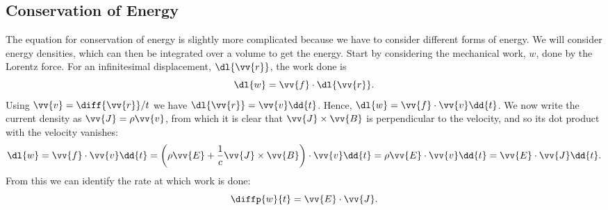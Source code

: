 \subsection{Conservation of Energy}
The equation for conservation of energy is slightly more complicated because we have to consider different forms of energy.
We will consider energy densities, which can then be integrated over a volume to get the energy.
Start by considering the mechanical work, \(w\), done by the Lorentz force.
For an infinitesimal displacement, \(\dl{\vv{r}}\), the work done is
\begin{equation}
    \dl{w} = \vv{f} \cdot \dl{\vv{r}}.
\end{equation}
Using \(\vv{v} = \diff{\vv{r}}/{t}\) we have \(\dl{\vv{r}} = \vv{v}\dd{t}\).
Hence, \(\dl{w} = \vv{f} \cdot \vv{v} \dd{t}\).
We now write the current density as \(\vv{J} = \rho\vv{v}\), from which it is clear that \(\vv{J} \times \vv{B}\) is perpendicular to the velocity, and so its dot product with the velocity vanishes:
\begin{equation}
    \dl{w} = \vv{f} \cdot \vv{v} \dd{t} = \left( \rho\vv{E} + \frac{1}{c}\vv{J} \times \vv{B} \right) \cdot \vv{v} \dd{t} = \rho\vv{E} \cdot \vv{v} \dd{t} = \vv{E} \cdot \vv{J} \dd{t}.
\end{equation}
From this we can identify the rate at which work is done:
\begin{equation}
    \diffp{w}{t} = \vv{E} \cdot \vv{J}.
\end{equation}

